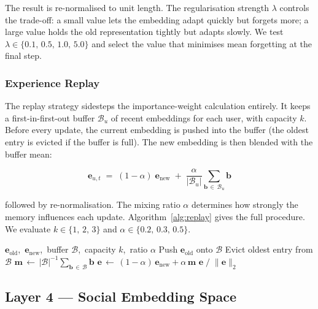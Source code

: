 \documentclass[conference]{IEEEtran}
\newcommand{\eb}{\mathbf{e}}
\newcommand{\lam}{\lambda}
\newcommand{\alph}{\alpha}
\begin{document}
The result is re-normalised to unit length. The
regularisation strength $\lam$ controls the trade-off: a
small value lets the embedding adapt quickly but forgets
more; a large value holds the old representation tightly but
adapts slowly. We test
$\lam \in \{0.1,\, 0.5,\, 1.0,\, 5.0\}$ and select the
value that minimises mean forgetting at the final step.

\subsubsection{Experience Replay}

The replay strategy sidesteps the importance-weight
calculation entirely. It keeps a first-in-first-out buffer
$\mathcal{B}_u$ of recent embeddings for each user, with
capacity $k$. Before every update, the current embedding is
pushed into the buffer (the oldest entry is evicted if the
buffer is full). The new embedding is then blended with the
buffer mean:

\begin{equation}
  \eb_{u,t}
  \;=\;
  (1 - \alph)\;\eb_{\mathrm{new}}
  \;+\;
  \frac{\alph}{|\mathcal{B}_u|}
  \sum_{\mathbf{b}\,\in\,\mathcal{B}_u} \mathbf{b}
  \label{eq:replay}
\end{equation}

followed by re-normalisation. The mixing ratio $\alph$
determines how strongly the memory influences each update.
Algorithm~\ref{alg:replay} gives the full procedure. We
evaluate $k \in \{1,\,2,\,3\}$ and
$\alph \in \{0.2,\,0.3,\,0.5\}$.

\begin{algorithm}[t]
  \caption{Experience Replay Embedding Update}
  \label{alg:replay}
  \begin{algorithmic}[1]
    \REQUIRE
      $\eb_{\mathrm{old}}$,\ $\eb_{\mathrm{new}}$,\
      buffer $\mathcal{B}$,\ capacity $k$,\ ratio $\alph$
    \STATE Push $\eb_{\mathrm{old}}$ onto $\mathcal{B}$
      \STATE Evict oldest entry from $\mathcal{B}$
    \ENDIF
    \STATE
      $\mathbf{m}
      \,\leftarrow\,
      |\mathcal{B}|^{-1}
      \sum_{\mathbf{b}\,\in\,\mathcal{B}} \mathbf{b}$
    \STATE
      $\eb
      \,\leftarrow\,
      (1-\alph)\,\eb_{\mathrm{new}}
      + \alph\,\mathbf{m}$
    \RETURN $\eb\;/\;\|\eb\|_{2}$
  \end{algorithmic}
\end{algorithm}

\subsection{Layer 4 --- Social Embedding Space}
\end{document}
